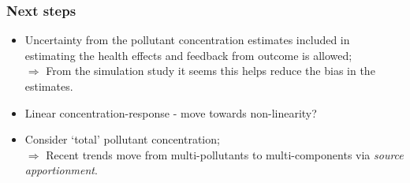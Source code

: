 \documentclass[slidestop,compress,serif,10pt]{beamer}
\begin{document}
\begin{frame}\frametitle{Next steps}
\begin{itemize}
\vfill\item Uncertainty from the pollutant concentration estimates included in estimating the health effects and feedback from outcome is allowed;\\
$\Rightarrow$ From the simulation study it seems this helps reduce the bias in the estimates.
\vfill\item Linear concentration-response - move towards non-linearity?
\vfill\item Consider `total' pollutant concentration;\\
$\Rightarrow$ Recent trends move from multi-pollutants to multi-components via \textit{source apportionment}.
\end{itemize}
\end{frame}
%
%
%
%
\end{document}
